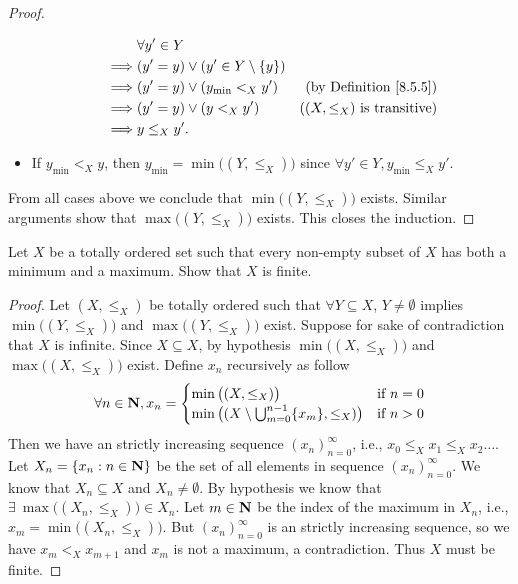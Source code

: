 \begin{proof}
\begin{itemize}
\begin{align*}
                           & \forall y' \in Y                                                                  \\
                  \implies & (y' = y) \lor (y' \in Y \setminus \{y\})                                          \\
                  \implies & (y' = y) \lor (y_{\min} <_X y')          & \text{(by Definition \ref{8.5.5})}     \\
                  \implies & (y' = y) \lor (y <_X y')                 & \text{(\((X, \leq_X)\) is transitive)} \\
                  \implies & y \leq_X y'.
              \end{align*}
        \item If \(y_{\min} <_X y\), then \(y_{\min} = \min\big((Y, \leq_X)\big)\) since \(\forall y' \in Y, y_{\min} \leq_X y'\).
    \end{itemize}
    From all cases above we conclude that \(\min\big((Y, \leq_X)\big)\) exists.
    Similar arguments show that \(\max\big((Y, \leq_X)\big)\) exists.
    This closes the induction.
\end{proof}

\begin{exercise}\label{ex 8.5.9}
    Let \(X\) be a totally ordered set such that every non-empty subset of \(X\) has both a minimum and a maximum.
    Show that \(X\) is finite.
\end{exercise}

\begin{proof}
    Let \((X, \leq_X)\) be totally ordered such that \(\forall Y \subseteq X\), \(Y \neq \emptyset\) implies \(\min\big((Y, \leq_X)\big)\) and \(\max\big((Y, \leq_X)\big)\) exist.
    Suppose for sake of contradiction that \(X\) is infinite.
    Since \(X \subseteq X\), by hypothesis \(\min\big((X, \leq_X)\big)\) and \(\max\big((X, \leq_X)\big)\) exist.
    Define \(x_n\) recursively as follow
    \[
        \forall n \in \mathbf{N}, x_n = \begin{cases}
            \min\big((X, \leq_X)\big)                                           & \text{if } n = 0 \\
            \min\big((X \setminus \bigcup_{m = 0}^{n - 1} \{x_m\}, \leq_X)\big) & \text{if } n > 0
        \end{cases}
    \]
    Then we have an strictly increasing sequence \((x_n)_{n = 0}^\infty\), i.e., \(x_0 \leq_X x_1 \leq_X x_2 \dots\).
    Let \(X_n = \{x_n : n \in \mathbf{N}\}\) be the set of all elements in sequence \((x_n)_{n = 0}^\infty\).
    We know that \(X_n \subseteq X\) and \(X_n \neq \emptyset\).
    By hypothesis we know that \(\exists\ \max\big((X_n, \leq_X)\big) \in X_n\).
    Let \(m \in \mathbf{N}\) be the index of the maximum in \(X_n\), i.e., \(x_m = \min\big((X_n, \leq_X)\big)\).
    But \((x_n)_{n = 0}^\infty\) is an strictly increasing sequence, so we have \(x_m <_X x_{m + 1}\) and \(x_m\) is not a maximum, a contradiction.
    Thus \(X\) must be finite.
\end{proof}

